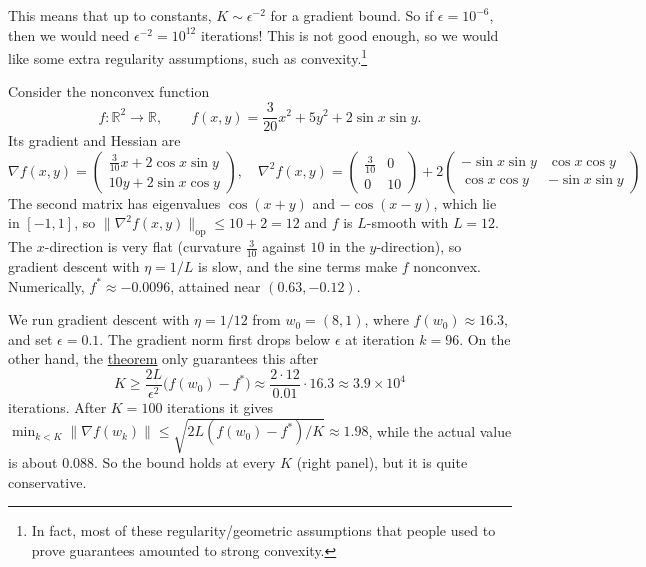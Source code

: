 	This means that up to constants, $K \sim \epsilon^{-2}$ for a gradient bound. So if $\epsilon = 10^{-6}$, then we would need $\epsilon^{-2} = 10^{12}$ iterations! This is not good enough, so we would like some extra regularity assumptions, such as convexity.\footnote{In fact, most of these regularity/geometric assumptions that people used to prove guarantees amounted to strong convexity.}

	\begin{example}
		\label{ex:criticality}
		Consider the nonconvex function 
		\begin{equation}
			f: \mathbb{R}^2 \to \mathbb{R}, \qquad f(x, y) = \frac{3}{20} x^2 + 5 y^2 + 2 \sin x \sin y.
		\end{equation}
		Its gradient and Hessian are 
		\begin{equation}
			\nabla f(x, y) = \begin{pmatrix} \frac{3}{10} x + 2 \cos x \sin y \\ 10 y + 2 \sin x \cos y \end{pmatrix}, \quad 
			\nabla^2 f(x, y) = \begin{pmatrix} \frac{3}{10} & 0 \\ 0 & 10 \end{pmatrix} + 2 \begin{pmatrix} -\sin x \sin y & \cos x \cos y \\ \cos x \cos y & -\sin x \sin y \end{pmatrix}
		\end{equation}
		The second matrix has eigenvalues $\cos(x + y)$ and $-\cos(x - y)$, which lie in $[-1, 1]$, so $\|\nabla^2 f(x, y)\|_{\mathrm{op}} \leq 10 + 2 = 12$ and $f$ is $L$-smooth with $L = 12$. The $x$-direction is very flat (curvature $\frac{3}{10}$ against $10$ in the $y$-direction), so gradient descent with $\eta = 1/L$ is slow, and the sine terms make $f$ nonconvex. Numerically, $f^\ast \approx -0.0096$, attained near $(0.63, -0.12)$. 

		We run gradient descent with $\eta = 1/12$ from $w_0 = (8, 1)$, where $f(w_0) \approx 16.3$, and set $\epsilon = 0.1$. The gradient norm first drops below $\epsilon$ at iteration $k = 96$. On the other hand, the \hyperref[thm:convergence_to_criticality_gd]{theorem} only guarantees this after 
		\begin{equation}
			K \geq \frac{2L}{\epsilon^2} \big( f(w_0) - f^\ast \big) \approx \frac{2 \cdot 12}{0.01} \cdot 16.3 \approx 3.9 \times 10^4
		\end{equation}
		iterations. After $K = 100$ iterations it gives $\min_{k < K} \|\nabla f(w_k)\| \leq \sqrt{2L(f(w_0) - f^\ast)/K} \approx 1.98$, while the actual value is about $0.088$. So the bound holds at every $K$ (right panel), but it is quite conservative. 


\end{example}
